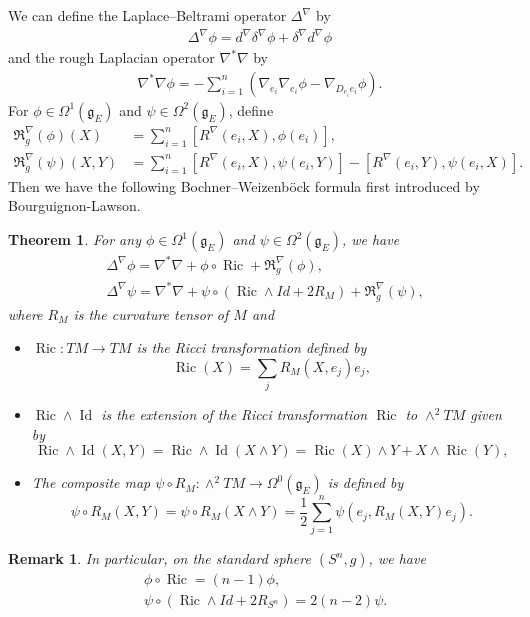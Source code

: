 \documentclass{amsart}
\newtheorem{theorem}{Theorem}[section]
\newtheorem{remark}{Remark}[section]
\begin{document}
	We can define the Laplace–Beltrami operator $\Delta^\nabla$ by
	\begin{align*}
		\Delta^\nabla\phi=d^\nabla\delta^\nabla\phi+\delta^\nabla d^\nabla\phi
	\end{align*}
	and the rough Laplacian operator $\nabla^\ast\nabla$ by
	\begin{align*}
		\nabla^\ast\nabla\phi=-\sum_{i=1}^n(\nabla_{e_i}\nabla_{e_i}\phi-\nabla_{D_{e_i}e_i}\phi).
	\end{align*}
	For $\phi\in\Omega^1(\mathfrak{g}_E)$ and $\psi\in\Omega^2(\mathfrak{g}_E)$, define
	\begin{align*}
		\mathfrak{R}_g^\nabla(\phi)(X)&=\sum_{i=1}^n[R^\nabla(e_i,X),\phi(e_i)],\\
		\mathfrak{R}_g^\nabla(\psi)(X,Y)&=\sum_{i=1}^n[R^\nabla(e_i,X),\psi(e_i,Y)]-[R^\nabla(e_i,Y),\psi(e_i,X)].
	\end{align*}
	Then we have the following Bochner–Weizenböck formula first introduced by Bourguignon-Lawson.
	\begin{theorem}\cite{BL}
		For any $\phi\in\Omega^1(\mathfrak{g}_E)$ and $\psi\in\Omega^2(\mathfrak{g}_E)$, we have
		\begin{align*}
			&\Delta^\nabla\phi=\nabla^\ast\nabla+\phi\circ\operatorname{Ric}+\mathfrak{R}_g^\nabla(\phi),\\
			&\Delta^\nabla\psi=\nabla^\ast\nabla+\psi\circ(\operatorname{Ric}\wedge Id+2R_M)+\mathfrak{R}_g^\nabla(\psi),
		\end{align*}
		where $R_M$ is the curvature tensor of $M$ and
		\begin{itemize}
			\item $\operatorname{Ric} :TM\to TM$ is the Ricci transformation defined by
			\[\operatorname{Ric}\left( X \right) =\sum_jR_M(X,e_j)e_j ,\]
			\item $ \operatorname{Ric}\wedge \operatorname{Id} $ is the extension of the Ricci transformation $\operatorname{Ric}$ to $\wedge^2 TM$ given by
			\[ \operatorname{Ric}\wedge \operatorname{Id}(X,Y)=\operatorname{Ric}\wedge \operatorname{Id}(X\wedge Y)=\operatorname{Ric}(X)\wedge Y+X\wedge \operatorname{Ric}(Y),\]
			\item The composite map $\psi\circ R_M :\wedge^2 TM \to \Omega^0 \left( \mathfrak{g}_E \right)  $ is defined by
			\[\psi\circ R_M(X,Y)=\psi\circ R_M(X\wedge Y )  =\frac{1}{2}\sum_{j=1}^{n} \psi( e_j, R_M(X,Y)e_j) .\]
		\end{itemize}
	\end{theorem}
	\begin{remark}
		In particular, on the standard sphere $(S^n,g)$, we have
		\begin{align*}
			&\phi\circ\operatorname{Ric}=(n-1)\phi,\\
			&\psi\circ(\operatorname{Ric}\wedge Id+2R_{S^n})=2(n-2)\psi.
		\end{align*}
	\end{remark}
\end{document}
